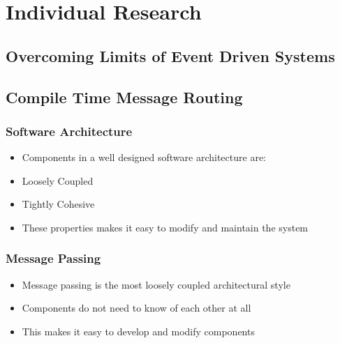 \documentclass{beamer}
\begin{document}
\section{Individual Research}
\begin{frame}
	\sectionpage
\end{frame}

	\subsection{Overcoming Limits of Event Driven Systems}
	\begin{frame}
		\subsectionpage
	\end{frame}
	
	\subsection{Compile Time Message Routing}
	\begin{frame}
		\subsectionpage
	\end{frame}
	
	\begin{frame}
		\frametitle{Software Architecture}
		\begin{itemize}
			\item Components in a well designed software architecture are:
			\item Loosely Coupled
			\item Tightly Cohesive
			\item These properties makes it easy to modify and maintain the system
		\end{itemize}
	\end{frame}
	
	\begin{frame}
		\frametitle{Message Passing}
		\begin{itemize}
			\item Message passing is the most loosely coupled architectural style
			\item Components do not need to know of each other at all
			\item This makes it easy to develop and modify components
		\end{itemize}
	\end{frame}
	
\end{document}
